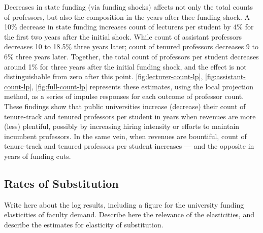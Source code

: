 Decreases in state funding (via funding shocks) affects not only the total counts of professors, but also the composition in the years after thee funding shock.
A 10\% decrease in state funding increases count of lecturers per student by 4\% for the first two years after the initial shock.
While count of assistant professors decreases 10 to 18.5\% three years later;
count of tenured professors decreases 9 to 6\% three years later.
Together, the total count of professors per student decreases around 1\% for three years after the initial funding shock, and the effect is not distinguishable from zero after this point.
\autoref{fig:lecturer-count-lp}, \ref{fig:assistant-count-lp}, \ref{fig:full-count-lp} represents these estimates, using the local projection method, as a series of impulse responses for each outcome of professor count.
These findings show that public universities increase (decrease) their count of tenure-track and tenured professors per student in years when revenues are more (less) plentiful, possibly by increasing hiring intensity or efforts to maintain incumbent professors.
In the same vein, when revenues are bountiful, count of tenure-track and tenured professors per student increases --- and the opposite in years of funding cuts.

\subsection{Rates of Substitution}
\label{sec:results-substituion}

Write here about the log results, including a figure for the university funding elasticities of faculty demand.
Describe here the relevance of the elasticities, and describe the estimates for elasticity of substitution.
